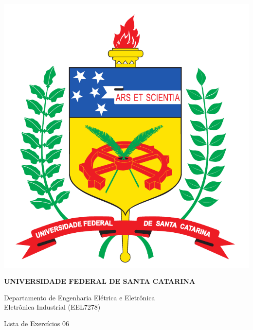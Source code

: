 \documentclass[11pt,paper=a4,answers]{exam}
\begin{document}
	
	\noindent
	\begin{minipage}[l]{.1\textwidth}%
		\noindent
		\includegraphics[width=2\textwidth]{logo-ufsc}
	\end{minipage}
	\hfill
	\begin{minipage}[r]{.8\textwidth}%
		\begin{center}
			{\large \bfseries UNIVERSIDADE FEDERAL DE SANTA CATARINA \par
				\large Departamento de Engenharia Elétrica e Eletrônica \\[4pt]
				Eletrônica Industrial {(EEL7278)}  \par
				\vspace{0.5cm}
				\huge Lista de Exercícios 06
				}
		\end{center}
	\end{minipage}	
		
		\par
		\noindent
		\uline
	\hfill 	
			
\end{document}
